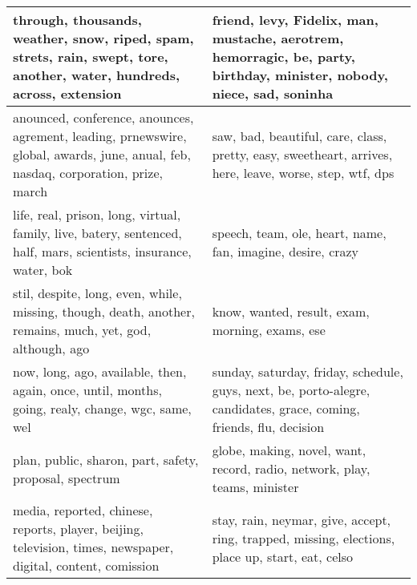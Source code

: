 \begin{table*}
\begin{tiny}
\begin{tabular}{|p{5.0cm}|p{5.0cm}|}
		through, thousands, weather, snow, riped, spam, strets, rain, swept, tore, another, water, hundreds, across, extension  &  friend, levy, Fidelix, man, mustache, aerotrem, hemorragic, be, party, birthday, minister, nobody, niece, sad, soninha \\ \hline
		anounced, conference, anounces, agrement, leading, prnewswire, global, awards, june, anual, feb, nasdaq, corporation, prize, march  &  saw, bad, beautiful, care, class, pretty, easy, sweetheart, arrives, here, leave, worse, step, wtf, dps \\ \hline
		life, real, prison, long, virtual, family, live, batery, sentenced, half, mars, scientists, insurance, water, bok  &  speech, team, ole, heart, name, fan, imagine, desire, crazy \\ \hline
		stil, despite, long, even, while, missing, though, death, another, remains, much, yet, god, although, ago  &  know, wanted, result, exam, morning, exams, ese \\ \hline
		now, long, ago, available, then, again, once, until, months, going, realy, change, wgc, same, wel  &  sunday, saturday, friday, schedule, guys, next, be, porto-alegre, candidates, grace, coming, friends, flu, decision \\ \hline
		plan, public, sharon, part, safety, proposal, spectrum  &  globe, making, novel, want, record, radio, network, play, teams, minister \\ \hline
		media, reported, chinese, reports, player, beijing, television, times, newspaper, digital, content, comission  &  stay, rain, neymar, give, accept, ring, trapped, missing, elections, place up, start, eat, celso \\ \hline
\end{tabular}
\end{tiny}



\end{table*}
